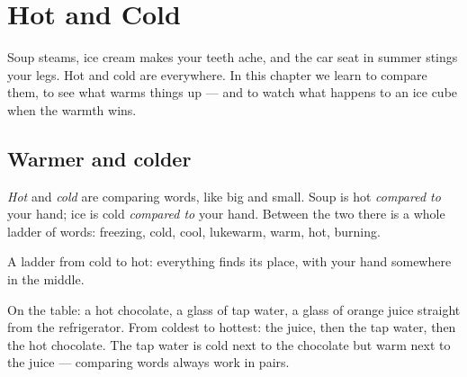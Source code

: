 \chapter{Hot and Cold}\label{ch:g1:hot-and-cold}

Soup steams, ice cream makes your teeth ache, and the car seat in
summer stings your legs. Hot and cold are everywhere. In this chapter
we learn to compare them, to see what warms things up --- and to
watch what happens to an ice cube when the warmth wins.

\section{Warmer and colder}

\begin{definition}\label{def:g1:hot-and-cold:words}
\emph{Hot} and \emph{cold} are comparing
words, like big and small. Soup is hot \emph{compared to} your hand;
ice is cold \emph{compared to} your hand. Between the two there is a
whole ladder of words: freezing, cold, cool, lukewarm, warm, hot,
burning.
\end{definition}

\begin{omfigure}

{\small A ladder from cold to hot: everything finds its place, with
your hand somewhere in the middle.}
\end{omfigure}

\begin{example}\label{ex:g1:hot-and-cold:drinks}
On the table: a hot chocolate, a glass of tap water, a glass of
orange juice straight from the refrigerator. From coldest to hottest:
the juice, then the tap water, then the hot chocolate. The tap water
is cold next to the chocolate but warm next to the juice ---
comparing words always work in pairs.
\end{example}

